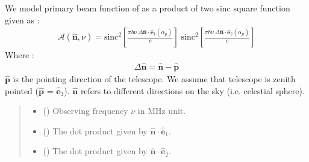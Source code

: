 \documentclass[a4paper,11pt,oneside,english,openany]{sphinxmanual}
\begin{document}

\begin{fulllineitems}
\label{\detokenize{simvis:simvis.beammwa}}
\pysigstartsignatures
{}
\pysigstopsignatures
\sphinxAtStartPar
We model primary beam function of  as a product of two sinc square function given as :
\begin{equation*}
\begin{split}\mathcal{A}(\hat{\mathbf{n}},\nu) = \text{sinc}^2\left[\frac{{\pi}b{\nu}\ \Delta\hat{\mathbf{n}}\cdot\hat{\mathbf{e}}_1 (\alpha_{p})}{c}\right]\;\text{sinc}^2\left[\frac{{\pi}b{\nu}\ \Delta\hat{\mathbf{n}}\cdot\hat{\mathbf{e}}_2 (\alpha_{p})}{c}\right]\end{split}
\end{equation*}
\sphinxAtStartPar
Where :
\begin{equation*}
\begin{split}\Delta\hat{\mathbf{n}}= \hat{\mathbf{n}}- \hat{\mathbf{p}}\end{split}
\end{equation*}
\sphinxAtStartPar
\(\hat{\mathbf{p}}\) is the pointing direction of the telescope. We assume that telescope is zenith pointed (\(\hat{\mathbf{p}}\) = \(\hat{\mathbf{e}}_3\)).
\(\hat{\mathbf{n}}\) refers to different directions on the sky (i.e. celestial sphere).
\begin{quote}\begin{description}
\begin{itemize}
\item {} 
\sphinxAtStartPar
{} () \textendash{} Observing frequency \(\nu\) in MHz unit.

\item {} 
\sphinxAtStartPar
{} () \textendash{} The dot product given by \(\hat{\mathbf{n}}\cdot\hat{\mathbf{e}}_ 1\).

\item {} 
\sphinxAtStartPar
{} () \textendash{} The dot product given by \(\hat{\mathbf{n}}\cdot\hat{\mathbf{e}}_ 2\).


\end{itemize}
\end{description}
\end{quote}
\end{fulllineitems}
\end{document}

